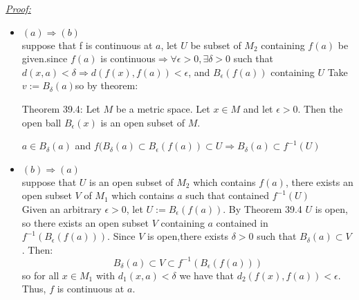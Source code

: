\documentclass{book}
\begin{document}
\begin{tcolorbox}[enhanced,attach boxed title to top center={yshift=-3mm,yshifttext=-1mm},
colback=blue!5!white,colframe=blue!75!black,colbacktitle=red!80!black,
title=Exercise 40.7:,fonttitle=\bfseries,
boxed title style={size=small,colframe=red!50!black} ]
\textit{\color{blue}\underline{Proof:}}
\begin{itemize}
\item {\color{red}$(a)\Rightarrow(b)$}\\
suppose that f is continuous at $a$, let $U$ be subset of $M_2$ containing $f(a)$ be given.since $f(a)$ is 
continuous$\Rightarrow\forall\epsilon>0,\exists\delta>0$ such that $d(x,a)<\delta\Rightarrow 
d(f(x),f(a))<\epsilon$, and $B_\epsilon(f(a))$ containing 
$U$
Take $v:=B_{\delta}(a)$so by theorem:
\begin{tcolorbox}[colback=red!5!white,colframe=red!75!black]
{\color{red}Theorem 39.4:}
Let $M$ be a metric space. Let $x\in M$ and let $\epsilon> 0.$ Then the open ball $B_\epsilon (x)$ is an open 
subset of $M$.
\end{tcolorbox}
$a\in B_\delta (a)$ and $f(B_\delta (a)\subset B_\epsilon (f(a))\subset U \Rightarrow B_\delta(a)\subset 
f^{-1}(U)$
\item {\color{red}$(b)\Rightarrow(a)$}\\
suppose that  $U$ is an open subset of $M_2$ which contains $f(a)$, there exists an open subset $V$ of $M_1$ 
which contains $a$ such that contained 
$f^{-1}(U)$\\
Given an arbitrary $\epsilon>0$, let $U := B_\epsilon(f(a))$. By Theorem 39.4 $U$ is open, so there exists an 
open subset $V$ containing $a$ contained in 
$f^{-1}(B_\epsilon(f(a))).$ Since $V$ is open,there exists $\delta>0$ such that $B_\delta(a)\subset V$ . Then:
$$B_\delta(a)\subset V\subset f^{-1}(B_\epsilon(f(a)))$$
so for all $x\in M_1$ with $d_1(x, a)<\delta$ we have that $d_2(f(x), f(a))<\epsilon$. Thus, $f$ is continuous 
at $a$.
\end{itemize}
\end{tcolorbox}
\end{document}
